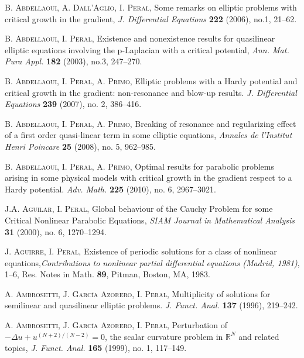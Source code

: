 \begin{thebibliography}{99} %
\small
{}    \textsc{B. Abdellaoui, A. Dall'Aglio, I. Peral,} Some remarks on elliptic problems with critical growth in the gradient,  \textit{J. Differential Equations} \textbf{222} (2006), no.1, 21--62.
 
    \textsc{B. Abdellaoui, I. Peral,} Existence and nonexistence results for quasilinear elliptic equations involving the p-Laplacian with a critical potential,  \textit{Ann. Mat. Pura Appl.}  \textbf{182} (2003), no.3, 247--270.

    \textsc{B. Abdellaoui, I. Peral, A. Primo}, {Elliptic problems with a Hardy potential and critical growth in the gradient: non-resonance and blow-up results.} \textit{J. Differential Equations} \textbf{239} (2007), no. 2, 386--416.

     \textsc{B. Abdellaoui, I. Peral, A. Primo}, {Breaking of resonance and regularizing effect of a first order quasi-linear term in some elliptic equations}, \textit{Annales de l'Institut Henri Poincare} \textbf{25} (2008), no. 5,  962--985.

    \textsc{B. Abdellaoui, I. Peral, A. Primo}, {Optimal results for parabolic problems arising in some physical models with critical growth in the gradient respect to a Hardy potential}. \textit{Adv. Math.} \textbf{225} (2010), no. 6,  2967--3021.

    \textsc{J.A. Aguilar, I. Peral,} Global behaviour of the Cauchy Problem for some Critical Nonlinear Parabolic Equations, \textit{SIAM Journal in Mathematical Analysis} \textbf{31}  (2000), no. 6, 1270--1294. 


   \textsc{J. Aguirre, I. Peral,} Existence of periodic solutions for a class of nonlinear equations,\textit{Contributions to nonlinear partial differential equations (Madrid, 1981)}, 1--6,  Res. Notes in Math. \textbf{89}, Pitman, Boston, MA, 1983.


     \textsc{A. Ambrosetti, J. Garc\'ia Azorero, I. Peral,}  Multiplicity of solutions for semilinear and quasilinear elliptic problems. \textit{J. Funct. Anal.} \textbf{137} (1996),  219--242.

    \textsc{A. Ambrosetti,  J. Garc\'ia Azorero, I. Peral,} Perturbation of $-\Delta u + u^{(N+2)/(N-2)} = 0$, the scalar curvature problem in $\mathbb{R}^N$ and related topics, \textit{J. Funct. Anal.} \textbf{165} (1999),  no. 1,  117--149. 



\end{thebibliography}
